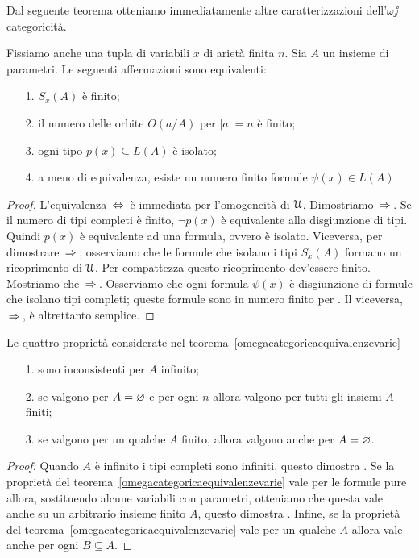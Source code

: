 Dal seguente teorema otteniamo immediatamente altre caratterizzazioni dell'$\omega\jj$catego\-ri\-ci\-t\`a.

\begin{theorem}\label{omegacategoricaequivalenzevarie} Fissiamo anche una tupla di variabili $x$ di ariet\`a finita $n$. Sia $A$ un insieme di parametri. Le seguenti affermazioni sono equivalenti:
\begin{itemize}
\item[1.] $S_x(A)$ \`e finito;
\item[2.] il numero delle orbite $O(a/A)$ per $|a|=n$ \`e finito;
\item[3.] ogni tipo $p(x)\subseteq L(A)$ \`e isolato;
\item[4.] a meno di equivalenza, esiste un numero finito formule $\psi(x)\in L(A)$.
\end{itemize}
\end{theorem}

\begin{proof} L'equivalenza $\,\Leftrightarrow\,$ \`e immediata per l'omogeneit\`a di $\EuScript U$. Dimostriamo $\,\Rightarrow\,$. Se il numero di tipi completi \`e finito, $\neg p(x)$ \`e equivalente alla disgiunzione di tipi. Quindi $p(x)$ \`e equivalente ad una formula, ovvero \`e isolato.  Viceversa, per dimostrare $\,\Rightarrow\,$, osserviamo che le formule che isolano i tipi $S_x(A)$ formano un ricoprimento di $\EuScript U$. Per compattezza questo ricoprimento dev'essere finito. Mostriamo che $\,\Rightarrow\,$. Osserviamo che ogni formula $\psi(x)$ \`e disgiunzione di  formule che isolano tipi completi; queste formule sono in numero finito per . Il viceversa, $\,\Rightarrow\,$, \`e altrettanto semplice.
\end{proof}

\begin{corollary}  Le quattro propriet\`a considerate nel teorema~\ref{omegacategoricaequivalenzevarie}
\begin{itemize}
\item[1.] sono inconsistenti per $A$ infinito;
\item[2.] se valgono per $A=\varnothing$ e per ogni $n$ allora valgono per tutti gli insiemi $A$ finiti; 
\item[3.] se valgono per un qualche $A$ finito, allora valgono anche per $A=\varnothing$.
\end{itemize}
\end{corollary}

\begin{proof} Quando $A$ \`e infinito i tipi completi sono infiniti, questo dimostra . Se la propriet\`a  del teorema~\ref{omegacategoricaequivalenzevarie} vale per le formule pure allora, sostituendo alcune variabili con parametri, otteniamo che questa vale anche su un arbitrario insieme finito $A$, questo dimostra . Infine, se la propriet\`a  del teorema~\ref{omegacategoricaequivalenzevarie} vale per un qualche $A$ allora vale anche per ogni $B\subseteq A$.
\end{proof}


